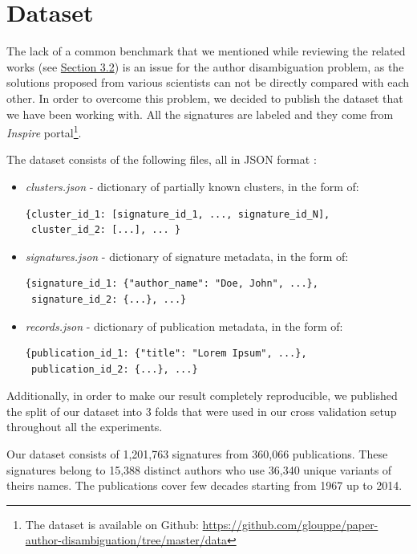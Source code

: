 \documentclass{pracamgr}
\newcommand{\myhy}[2]{\hyperref[#1]{#2}}
\begin{document}
\chapter{Dataset}

The lack of a common benchmark that we mentioned while reviewing the related works
(see \myhy{sec:related}{Section 3.2}) is an issue for the author disambiguation
problem, as
the solutions proposed from various scientists can not be directly compared with
each other. In order to overcome this problem, we decided to publish the dataset
that we have been working with. All the signatures are labeled
and they come from \textit{Inspire} portal\footnote{The dataset is available on Github: \href{https://github.com/glouppe/paper-author-disambiguation/tree/master/data}{https://github.com/glouppe/paper-author-disambiguation/tree/master/data}}.

The dataset consists of the following files, all in JSON format \citep{EcmaScript}:

% 

\begin{itemize}
\item \textit{clusters.json} - dictionary of partially known clusters, in the form of:
\begin{lstlisting}
{cluster_id_1: [signature_id_1, ..., signature_id_N],
 cluster_id_2: [...], ... }
\end{lstlisting}
\item \textit{signatures.json} - dictionary of signature metadata, in the form of:
\begin{lstlisting}
{signature_id_1: {"author_name": "Doe, John", ...},
 signature_id_2: {...}, ...}
\end{lstlisting}
\item \textit{records.json} - dictionary of publication metadata, in the form of:
\begin{lstlisting}
{publication_id_1: {"title": "Lorem Ipsum", ...},
 publication_id_2: {...}, ...}
\end{lstlisting}
\end{itemize}

Additionally, in order to make our result completely reproducible, we published
the split of our dataset into 3 folds that were used in our cross validation
setup throughout all the experiments.

Our dataset consists of 1,201,763 signatures from 360,066 publications. These
signatures belong to 15,388 distinct authors who use 36,340 unique variants
of theirs names. The publications cover few decades starting from 1967 up to 2014.
\end{document}
